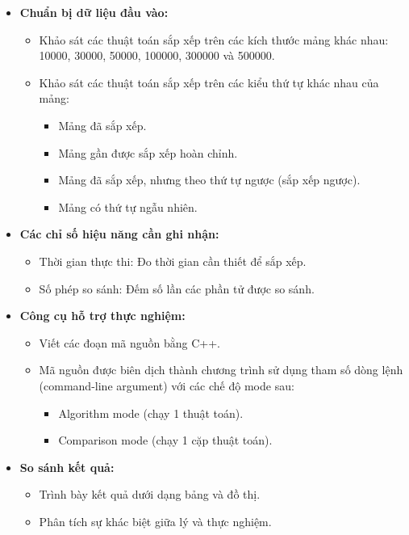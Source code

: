 \begin{itemize}
    \item \textbf{Chuẩn bị dữ liệu đầu vào:}
    \begin{itemize}
    \item Khảo sát các thuật toán sắp xếp trên các kích thước mảng khác nhau: 10000, 30000, 50000, 100000, 300000 và 500000.
    \item Khảo sát các thuật toán sắp xếp trên các kiểu thứ tự khác nhau của mảng:
        \begin{itemize}
            \item Mảng đã sắp xếp.
            \item Mảng gần được sắp xếp hoàn chỉnh.
            \item Mảng đã sắp xếp, nhưng theo thứ tự ngược (sắp xếp ngược).
            \item Mảng có thứ tự ngẫu nhiên.
        \end{itemize}
    \end{itemize}
    \item \textbf{Các chỉ số hiệu năng cần ghi nhận:}
    \begin{itemize}
        \item Thời gian thực thi: Đo thời gian cần thiết để sắp xếp.
        \item Số phép so sánh: Đếm số lần các phần tử được so sánh.
    \end{itemize}
    \item \textbf{Công cụ hỗ trợ thực nghiệm:}
    \begin{itemize}
        \item Viết các đoạn mã nguồn bằng C++.
        \item Mã nguồn được biên dịch thành chương trình sử dụng tham số dòng lệnh (command-line argument) với các chế độ mode sau:
        \begin{itemize}
            \item Algorithm mode (chạy 1 thuật toán).
            \item Comparison mode (chạy 1 cặp thuật toán).
        \end{itemize}
    \end{itemize}
    \item \textbf{So sánh kết quả:}
    \begin{itemize}
        \item Trình bày kết quả dưới dạng bảng và đồ thị.
        \item Phân tích sự khác biệt giữa lý và thực nghiệm.
    \end{itemize}
\end{itemize}

